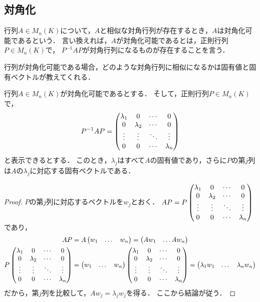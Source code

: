 \subsection{対角化}
\begin{dfn}
    行列$A \in M_n(K)$について，$A$と相似な対角行列が存在するとき，$A$は対角化可能であるという．
    言い換えれば，$A$が対角化可能であるとは，正則行列$P \in M_n(K)$で，
    $P^{-1}AP$が対角行列になるものが存在することを言う．
\end{dfn}
行列が対角化可能である場合，どのような対角行列に相似になるかは固有値と固有ベクトルが教えてくれる．
\begin{prop}
    行列$A \in M_n(K)$が対角化可能であるとする．
    そして，正則行列$P \in M_n(K)$で，
    \[
        P^{-1}AP = \begin{pmatrix} 
            \lambda_1 & 0 & \cdots & 0 \\
            0 & \lambda_2 & \cdots & 0 \\
            \vdots & \vdots & \ddots & \vdots \\
            0 & 0 & \cdots & \lambda_n \end{pmatrix}    
    \]
    と表示できるとする．
    このとき，$\lambda_j$はすべて$A$の固有値であり，さらに$P$の第$j$列は$A$の$\lambda_j$に対応する固有ベクトルである．
\end{prop}
\begin{proof}
    $P$の第$j$列に対応するベクトルを$w_j$とおく．
    $AP = P \begin{pmatrix} 
        \lambda_1 & 0 & \cdots & 0 \\
        0 & \lambda_2 & \cdots & 0 \\
        \vdots & \vdots & \ddots & \vdots \\
        0 & 0 & \cdots & \lambda_n \end{pmatrix}$
    であり，
    \[
        \begin{split}
            AP &= A\begin{pmatrix} w_1 & \dots & w_n \end{pmatrix} = \begin{pmatrix} A w_1 & \dots A w_n \end{pmatrix} \\
            P \begin{pmatrix} 
        \lambda_1 & 0 & \cdots & 0 \\
        0 & \lambda_2 & \cdots & 0 \\
        \vdots & \vdots & \ddots & \vdots \\
        0 & 0 & \cdots & \lambda_n \end{pmatrix} &= \begin{pmatrix} w_1 & \dots & w_n \end{pmatrix} \begin{pmatrix} 
            \lambda_1 & 0 & \cdots & 0 \\
            0 & \lambda_2 & \cdots & 0 \\
            \vdots & \vdots & \ddots & \vdots \\
            0 & 0 & \cdots & \lambda_n \end{pmatrix}
            = \begin{pmatrix} \lambda_1 w_1 & \dots & \lambda_n w_n \end{pmatrix}
        \end{split}
    \]
    だから，第$j$列を比較して，$Aw_j = \lambda_j w_j$を得る．
    ここから結論が従う．
\end{proof}

